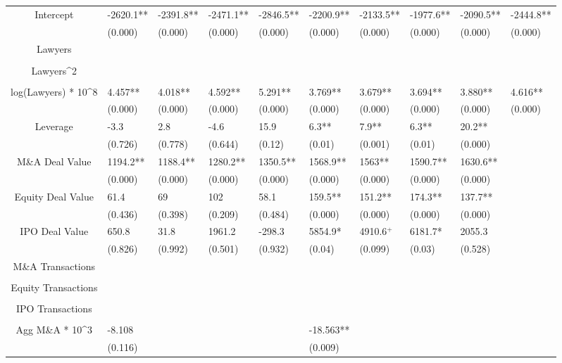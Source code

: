 \documentclass{article}
\begin{document}
\begin{table}[H]
\begin{tabular}{|clllllllll|}
Intercept & -2620.1** & -2391.8** & -2471.1** & -2846.5** & -2200.9** & -2133.5** & -1977.6** & -2090.5** & -2444.8** \\ 
   & (0.000) & (0.000) & (0.000) & (0.000) & (0.000) & (0.000) & (0.000) & (0.000) & (0.000) \\ 
  Lawyers &  &  &  &  &  &  &  &  &  \\ 
   &  &  &  &  &  &  &  &  &  \\ 
  Lawyers^2 &  &  &  &  &  &  &  &  &  \\ 
   &  &  &  &  &  &  &  &  &  \\ 
  log(Lawyers) * 10^8 & 4.457** & 4.018** & 4.592** & 5.291** & 3.769** & 3.679** & 3.694** & 3.880** & 4.616** \\ 
   & (0.000) & (0.000) & (0.000) & (0.000) & (0.000) & (0.000) & (0.000) & (0.000) & (0.000) \\ 
  Leverage & -3.3 & 2.8 & -4.6 & 15.9 & 6.3** & 7.9** & 6.3** & 20.2** &  \\ 
   & (0.726) & (0.778) & (0.644) & (0.12) & (0.01) & (0.001) & (0.01) & (0.000) &  \\ 
  M\&A Deal Value & 1194.2** & 1188.4** & 1280.2** & 1350.5** & 1568.9** & 1563** & 1590.7** & 1630.6** &  \\ 
   & (0.000) & (0.000) & (0.000) & (0.000) & (0.000) & (0.000) & (0.000) & (0.000) &  \\ 
  Equity Deal Value & 61.4 & 69 & 102 & 58.1 & 159.5** & 151.2** & 174.3** & 137.7** &  \\ 
   & (0.436) & (0.398) & (0.209) & (0.484) & (0.000) & (0.000) & (0.000) & (0.000) &  \\ 
  IPO Deal Value & 650.8 & 31.8 & 1961.2 & -298.3 & 5854.9* & 4910.6$^{+}$ & 6181.7* & 2055.3 &  \\ 
   & (0.826) & (0.992) & (0.501) & (0.932) & (0.04) & (0.099) & (0.03) & (0.528) &  \\ 
  M\&A Transactions &  &  &  &  &  &  &  &  &  \\ 
   &  &  &  &  &  &  &  &  &  \\ 
  Equity Transactions &  &  &  &  &  &  &  &  &  \\ 
   &  &  &  &  &  &  &  &  &  \\ 
  IPO Transactions &  &  &  &  &  &  &  &  &  \\ 
   &  &  &  &  &  &  &  &  &  \\ 
  Agg M\&A * 10^3 & -8.108 &  &  &  & -18.563** &  &  &  &  \\ 
   & (0.116) &  &  &  & (0.009) &  &  &  &  \\ 

\end{tabular}
\end{table}
\end{document}
